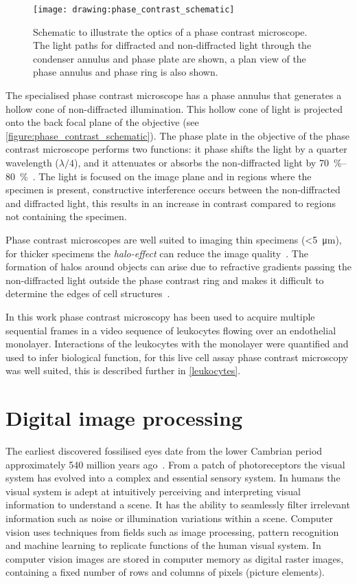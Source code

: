 \begin{figure}[htbp!]
	\centering
	\texttt{[image: drawing:phase\_contrast\_schematic]}
	\caption[Schematic of phase contrast microscopy optics]{Schematic to illustrate the optics of a phase contrast microscope. The light paths for diffracted and non-diffracted light through the condenser annulus and phase plate are shown, a plan view of the phase annulus and phase ring is also shown.}
	\label{figure:phase_contrast_schematic}
\end{figure}

The specialised phase contrast microscope has a phase annulus that generates a hollow cone of non-diffracted illumination. This hollow cone of light is projected onto the back focal plane of the objective (see \autoref{figure:phase_contrast_schematic}). The phase plate in the objective of the phase contrast microscope performs two functions: it phase shifts the light by a quarter wavelength ($\lambda/4$), and it attenuates or absorbs the non-diffracted light by \SIrange{70}{80}{\percent}~\cite{Spector2006}. The light is focused on the image plane and in regions where the specimen is present, constructive interference occurs between the non-diffracted and diffracted light, this results in an increase in contrast compared to regions not containing the specimen.

Phase contrast microscopes are well suited to imaging thin specimens (\textless \SI{5}{\micro\meter}), for thicker specimens the \emph{halo-effect} can reduce the image quality~\cite{Spector2006}. The formation of halos around objects can arise due to refractive gradients passing the non-diffracted light outside the phase contrast ring and makes it difficult to determine the edges of cell structures~\cite{Otaki2000}.

In this work phase contrast microscopy has been used to acquire multiple sequential frames in a video sequence of leukocytes flowing over an endothelial monolayer. Interactions of the leukocytes with the monolayer were quantified and used to infer biological function, for this live cell assay phase contrast microscopy was well suited, this is described further in \autoref{leukocytes}.

\section{Digital image processing}
\label{introduction:image_processing}
The earliest discovered fossilised eyes date from the lower Cambrian period approximately 540 million years ago~\cite{Parker2011}. From a patch of photoreceptors the visual system has evolved into a complex and essential sensory system. In humans the visual system is adept at intuitively perceiving and interpreting visual information to understand a scene. It has the ability to seamlessly filter irrelevant information such as noise or illumination variations within a scene. Computer vision uses techniques from fields such as image processing, pattern recognition and machine learning to replicate functions of the human visual system. In computer vision images are stored in computer memory as digital raster images, containing a fixed number of rows and columns of pixels (picture elements).


